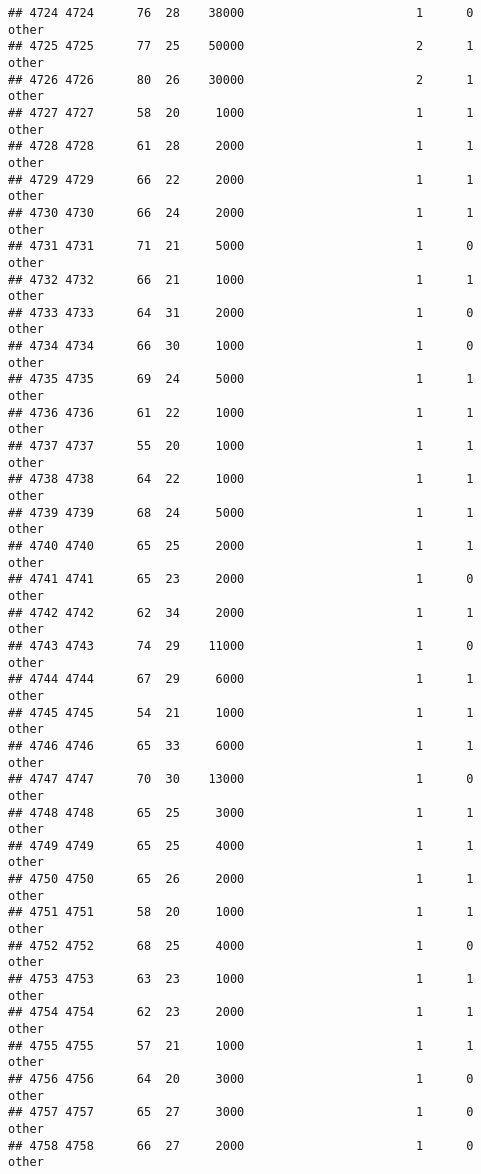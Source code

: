 \documentclass[
]{article}
\begin{document}
\begin{verbatim}
## 4724 4724      76  28    38000                        1      0    other
## 4725 4725      77  25    50000                        2      1    other
## 4726 4726      80  26    30000                        2      1    other
## 4727 4727      58  20     1000                        1      1    other
## 4728 4728      61  28     2000                        1      1    other
## 4729 4729      66  22     2000                        1      1    other
## 4730 4730      66  24     2000                        1      1    other
## 4731 4731      71  21     5000                        1      0    other
## 4732 4732      66  21     1000                        1      1    other
## 4733 4733      64  31     2000                        1      0    other
## 4734 4734      66  30     1000                        1      0    other
## 4735 4735      69  24     5000                        1      1    other
## 4736 4736      61  22     1000                        1      1    other
## 4737 4737      55  20     1000                        1      1    other
## 4738 4738      64  22     1000                        1      1    other
## 4739 4739      68  24     5000                        1      1    other
## 4740 4740      65  25     2000                        1      1    other
## 4741 4741      65  23     2000                        1      0    other
## 4742 4742      62  34     2000                        1      1    other
## 4743 4743      74  29    11000                        1      0    other
## 4744 4744      67  29     6000                        1      1    other
## 4745 4745      54  21     1000                        1      1    other
## 4746 4746      65  33     6000                        1      1    other
## 4747 4747      70  30    13000                        1      0    other
## 4748 4748      65  25     3000                        1      1    other
## 4749 4749      65  25     4000                        1      1    other
## 4750 4750      65  26     2000                        1      1    other
## 4751 4751      58  20     1000                        1      1    other
## 4752 4752      68  25     4000                        1      0    other
## 4753 4753      63  23     1000                        1      1    other
## 4754 4754      62  23     2000                        1      1    other
## 4755 4755      57  21     1000                        1      1    other
## 4756 4756      64  20     3000                        1      0    other
## 4757 4757      65  27     3000                        1      0    other
## 4758 4758      66  27     2000                        1      0    other

\end{verbatim}
\end{document}
